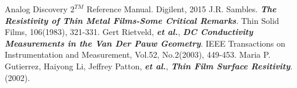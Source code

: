 \documentclass[5p,sort&compress]{elsarticle}
\begin{document}


\begin{thebibliography}{9}

\bibitem{} 
Analog Discovery $2^{TM}$ Reference Manual. Digilent, 2015
\bibitem{} 
J.R. Sambles. \textbf{\textit{The Resistivity of Thin Metal Films-Some Critical Remarks}}. Thin Solid Films, 106(1983), 321-331.
\bibitem{} 
Gert Rietveld, \textbf{\textit{et al.}}, \textbf{\textit{DC Conductivity Measurements in the Van Der Pauw Geometry}}. IEEE Transactions on Instrumentation and Measurement, Vol.52, No.2(2003), 449-453.
\bibitem{} 
Maria P. Gutierrez, Haiyong Li, Jeffrey Patton, \textbf{\textit{et al.}}, \textbf{\textit{Thin Film Surface Resitivity}}.(2002).


\end{thebibliography}
\end{document}
